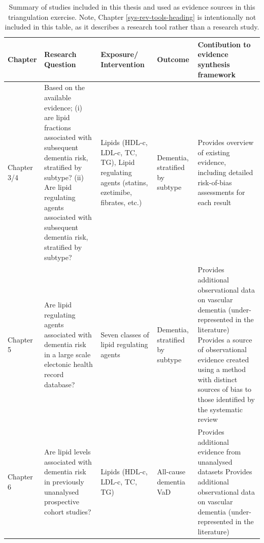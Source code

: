\documentclass[a4paper, twoside]{templates/ociamthesis}
\begin{document}
\begin{table}[H]

\caption[Summary of research designs included in this thesis]{\label{tab:thesisOverview-table}Summary of studies included in this thesis and used as evidence sources in this triangulation exercise. Note, Chapter \ref{sys-rev-tools-heading} is intentionally not included in this table, as it describes a research tool rather than a research study.}
\centering
\begin{tabular}[t]{>{\raggedright\arraybackslash}p{6em}>{\raggedright\arraybackslash}p{16em}>{\raggedright\arraybackslash}p{7em}>{\raggedright\arraybackslash}p{7em}>{\raggedright\arraybackslash}p{16em}}
\toprule
\textbf{Chapter} & \textbf{Research Question} & \textbf{Exposure/ Intervention} & \textbf{Outcome} & \textbf{Contibution to evidence synthesis framework}\\
\midrule
Chapter 3/4 & Based on the available evidence; \newline (i) are lipid fractions associated with subsequent dementia risk, stratified by subtype? \newline (ii) Are lipid regulating agents associated with subsequent dementia risk, stratified by subtype? \newline & Lipids (HDL-c, LDL-c, TC, TG), \newline \newline Lipid regulating agents (statins, ezetimibe, fibrates, etc.) & Dementia, stratified by subtype & Provides overview of existing evidence, including detailed risk-of-bias assessments for each result\\
\midrule
Chapter 5 & Are lipid regulating agents associated with dementia risk in a large scale electonic health record database? \newline & Seven classes of lipid regulating agents & Dementia, stratified by subtype & Provides additional observational data on vascular dementia (under-represented in the literature) \newline \newline Provides a source of observational evidence created using a method with distinct sources of bias to those identified by the systematic review\\
\midrule
Chapter 6 & Are lipid levels associated with dementia risk in previously unanalysed prospective cohort studies? \newline & Lipids (HDL-c, LDL-c, TC, TG) & All-cause dementia \newline VaD & Provides additional evidence from unanalysed datasets \newline \newline Provides additional observational data on vascular dementia (under-represented in the literature)\\
\bottomrule
\end{tabular}
\end{table}
\end{document}
